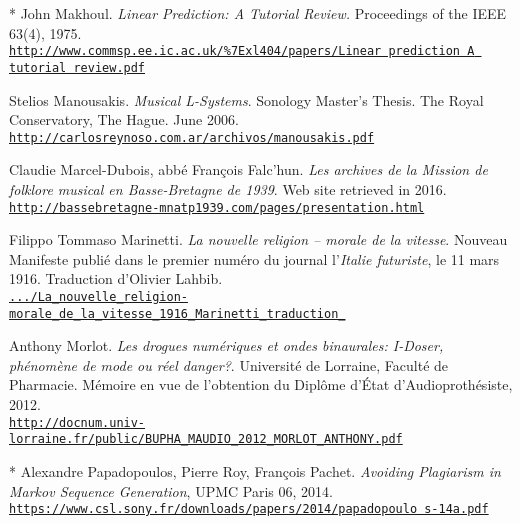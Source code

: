 \begin{thebibliography}{99}
	* John Makhoul. \textit{Linear Prediction: A Tutorial Review.} Proceedings of the IEEE 63(4), 1975.\\ \href{https://www.commsp.ee.ic.ac.uk/\%7Exl404/papers/Linear\%20prediction\%20A\%20tutorial\%20review.pdf}{\scriptsize{\texttt{http://www.commsp.ee.ic.ac.uk/\%7Exl404/papers/Linear prediction A tutorial review.pdf}}} \normalsize{}
		 
	Stelios Manousakis. \textit{Musical L-Systems}. Sonology Master's Thesis. The Royal Conservatory, The Hague. June 2006.\\ \href{http://carlosreynoso.com.ar/archivos/manousakis.pdf}{\scriptsize{\texttt{http://carlosreynoso.com.ar/archivos/manousakis.pdf}}} \normalsize{}
	
	Claudie Marcel-Dubois, abb\'e François Falc'hun. \textit{Les archives de la Mission de folklore musical en Basse-Bretagne de 1939}. Web site retrieved in 2016.\\ 
	\href{http://bassebretagne-mnatp1939.com/pages/presentation.html}{\scriptsize{\texttt{http://bassebretagne-mnatp1939.com/pages/presentation.html}}} \normalsize{}
	
	Filippo Tommaso Marinetti. \textit{La nouvelle religion -- morale de la vitesse}. Nouveau Manifeste publié dans le premier numéro du journal l'\textit{Italie futuriste}, le 11 mars 1916. Traduction d'Olivier Lahbib.\\ 
	\href{https://www.academia.edu/12024655/La\_nouvelle\_religion-morale\_de\_la\_vitesse\_1916\_Marinetti\_traduction\_}{\scriptsize{\texttt{.../La\_nouvelle\_religion-morale\_de\_la\_vitesse\_1916\_Marinetti\_traduction\_}}} \normalsize{}
	
	
	Anthony Morlot. \textit{Les drogues num\'eriques et ondes
binaurales: I-Doser, ph\'enom\`ene de mode ou r\'eel danger?}. Universit\'e de Lorraine, Facult\'e de Pharmacie. M\'emoire en vue de l'obtention du Dipl\^ome d'\'Etat d'Audioproth\'esiste, 2012.\\ 
	\href{http://docnum.univ-lorraine.fr/public/BUPHA\_MAUDIO\_2012\_MORLOT\_ANTHONY.pdf}{\scriptsize{\texttt{http://docnum.univ-lorraine.fr/public/BUPHA\_MAUDIO\_2012\_MORLOT\_ANTHONY.pdf}}} \normalsize{}
	
	* Alexandre Papadopoulos, Pierre Roy, Fran\c cois Pachet. \textit{Avoiding Plagiarism in Markov Sequence Generation}, UPMC Paris 06, 2014.\\ \href{https://www.csl.sony.fr/downloads/papers/2014/papadopoulo s-14a.pdf}{\scriptsize{\texttt{https://www.csl.sony.fr/downloads/papers/2014/papadopoulo s-14a.pdf}}} \normalsize{}
	

\end{thebibliography}
